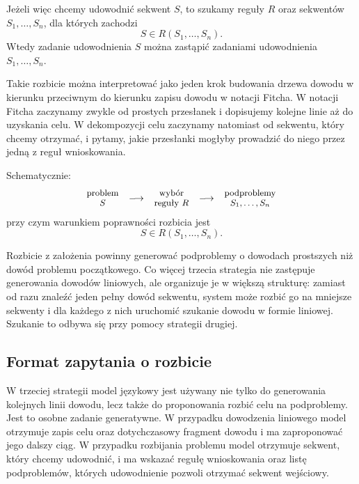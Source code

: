 \documentclass[shortabstract]{iithesis}
\theoremstyle{definition}
\theoremstyle{remark}
\theoremstyle{plain}
\begin{document}
Jeżeli więc chcemy udowodnić sekwent \(S\), to szukamy reguły \(R\) oraz
sekwentów \(S_1,\ldots,S_n\), dla których zachodzi
\[
S \in R(S_1,\ldots,S_n).
\]
Wtedy zadanie udowodnienia \(S\) można zastąpić zadaniami udowodnienia
\(S_1,\ldots,S_n\).

Takie rozbicie można interpretować jako jeden krok budowania drzewa dowodu
w kierunku przeciwnym do kierunku zapisu dowodu w notacji Fitcha. W notacji
Fitcha zaczynamy zwykle od prostych przesłanek i dopisujemy kolejne linie aż
do uzyskania celu. W dekompozycji celu zaczynamy natomiast od sekwentu,
który chcemy otrzymać, i pytamy, jakie przesłanki mogłyby prowadzić do niego
przez jedną z reguł wnioskowania.

Schematycznie:
\[
\small
\begin{array}{c}
\text{problem}\\[-0.2ex]
S
\end{array}
\;\longrightarrow\;
\begin{array}{c}
\text{wybór}\\[-0.2ex]
\text{reguły } R
\end{array}
\;\longrightarrow\;
\begin{array}{c}
\text{podproblemy}\\[-0.2ex]
S_1,\ldots,S_n
\end{array}
\]
przy czym warunkiem poprawności rozbicia jest
\[
S \in R(S_1,\ldots,S_n).
\]

Rozbicie z założenia powinny generować podproblemy o dowodach prostszych niż dowód problemu początkowego.
Co więcej trzecia strategia nie zastępuje generowania dowodów liniowych, ale
organizuje je w większą strukturę: zamiast od razu znaleźć jeden
pełny dowód sekwentu, system może rozbić go na mniejsze sekwenty i dla
każdego z nich uruchomić szukanie dowodu w formie liniowej. Szukanie to odbywa się
przy pomocy strategii drugiej.


\subsection{Format zapytania o rozbicie}

W trzeciej strategii model językowy jest używany nie tylko do generowania kolejnych
linii dowodu, lecz także do proponowania rozbić celu na podproblemy. Jest to osobne
zadanie generatywne. W przypadku dowodzenia liniowego model otrzymuje zapis celu
oraz dotychczasowy fragment dowodu i ma zaproponować jego dalszy ciąg. W przypadku
rozbijania problemu model otrzymuje sekwent, który chcemy udowodnić, i ma wskazać
regułę wnioskowania oraz listę podproblemów, których udowodnienie pozwoli otrzymać
sekwent wejściowy.
\end{document}
